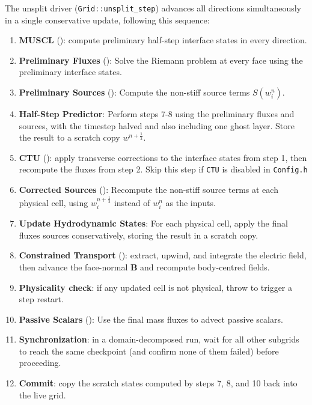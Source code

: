 \documentclass[11pt]{report}
\newcommand{\cpp}[1]{\lstinline[language=C++]{#1}}
\newcommand{\bash}[1]{\lstinline[language=bash]{#1}}
\begin{document}
The unsplit driver (\cpp{Grid::unsplit_step}) advances all
directions simultaneously in a single conservative update, following
this sequence:
\begin{enumerate}
\item \textbf{MUSCL}  (): compute preliminary half-step interface states in every direction.
\item \textbf{Preliminary Fluxes} (): Solve the Riemann problem at every face using the preliminary interface states.
\item \textbf{Preliminary Sources} (): Compute the non-stiff source terms $S(w^n_i)$.%
\item \textbf{Half-Step Predictor}: Perform steps 7-8 using the preliminary fluxes and sources, with the timestep halved and also including one ghost layer. Store the result to a scratch copy $w^{n+\frac12}$.
\item \textbf{CTU} (): apply transverse corrections to the interface states from step 1, then recompute the fluxes from step 2. Skip this step if \cpp{CTU} is disabled in \bash{Config.h}
\item \textbf{Corrected Sources} (): Recompute the non-stiff source terms at each physical cell, using $w^{n+\frac12}_i$ instead of $w^n_i$ as the inputs.
\item \textbf{Update Hydrodynamic States}: For each physical cell, apply the final fluxes sources conservatively, storing the result in a scratch copy.
\item \textbf{Constrained Transport}  (): extract, upwind, and integrate the electric field, then advance the face-normal $\mathbf B$ and recompute body-centred fields.
\item \textbf{Physicality check}: if any updated cell is not physical, throw to trigger a step restart.
\item \textbf{Passive Scalars} (): Use the final mass fluxes to advect passive scalars.
\item \textbf{Synchronization}: in a domain-decomposed run, wait for all other subgrids to reach the same checkpoint (and confirm none of them failed) before proceeding.
\item \textbf{Commit}: copy the scratch states computed by steps 7, 8, and 10 back into the live grid.
\end{enumerate}
\end{document}

